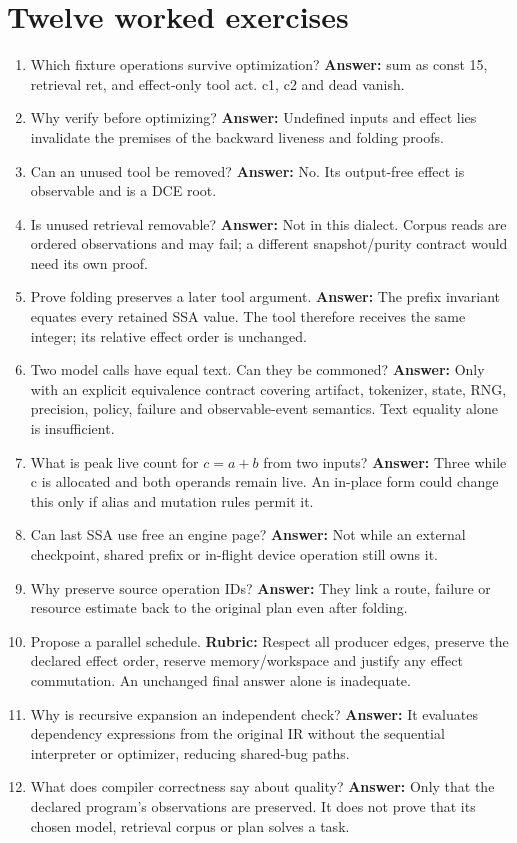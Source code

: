 \section{Twelve worked exercises}
\label{evod41:exercises}
\begin{enumerate}
\item Which fixture operations survive optimization? \textbf{Answer:}
sum as const 15, retrieval ret, and effect-only tool act. c1, c2 and dead vanish.
\item Why verify before optimizing? \textbf{Answer:} Undefined inputs and
effect lies invalidate the premises of the backward liveness and folding proofs.
\item Can an unused tool be removed? \textbf{Answer:} No. Its output-free
effect is observable and is a DCE root.
\item Is unused retrieval removable? \textbf{Answer:} Not in this dialect.
Corpus reads are ordered observations and may fail; a different snapshot/purity
contract would need its own proof.
\item Prove folding preserves a later tool argument. \textbf{Answer:}
The prefix invariant equates every retained SSA value. The tool therefore
receives the same integer; its relative effect order is unchanged.
\item Two model calls have equal text. Can they be commoned?
\textbf{Answer:} Only with an explicit equivalence contract covering artifact,
tokenizer, state, RNG, precision, policy, failure and observable-event semantics.
Text equality alone is insufficient.
\item What is peak live count for $c=a+b$ from two inputs?
\textbf{Answer:} Three while c is allocated and both operands remain live.
An in-place form could change this only if alias and mutation rules permit it.
\item Can last SSA use free an engine page? \textbf{Answer:} Not while an
external checkpoint, shared prefix or in-flight device operation still owns it.
\item Why preserve source operation IDs? \textbf{Answer:} They link a route,
failure or resource estimate back to the original plan even after folding.
\item Propose a parallel schedule. \textbf{Rubric:} Respect all producer
edges, preserve the declared effect order, reserve memory/workspace and justify
any effect commutation. An unchanged final answer alone is inadequate.
\item Why is recursive expansion an independent check?
\textbf{Answer:} It evaluates dependency expressions from the original IR
without the sequential interpreter or optimizer, reducing shared-bug paths.
\item What does compiler correctness say about quality?
\textbf{Answer:} Only that the declared program's observations are preserved.
It does not prove that its chosen model, retrieval corpus or plan solves a task.
\end{enumerate}


